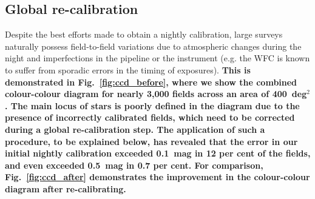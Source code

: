 \documentclass[a4paper,useAMS,usenatbib]{mn2e}
\begin{document}
\subsection{Global re-calibration}

Despite the best efforts made to obtain a nightly calibration,
large surveys naturally possess field-to-field variations
due to atmospheric changes during the night
and imperfections in the pipeline or the instrument
(e.g. the WFC is known to suffer from sporadic errors
in the timing of exposures).
{ \bf
This is demonstrated in Fig.~\ref{fig:ccd_before},
where we show the combined colour-colour diagram
for nearly 3,000 fields across an area of 400~deg$^2$.
The main locus of stars is poorly defined
in the diagram due to the presence of
incorrectly calibrated fields,
which need to be corrected
during a global re-calibration step.
The application of such a procedure,
to be explained below,
has revealed that the error in our initial nightly calibration
exceeded 0.1~mag in 12 per cent of the fields,
and even exceeded 0.5~mag in 0.7 per cent.
For comparison, Fig.~\ref{fig:ccd_after}
demonstrates the improvement 
in the colour-colour diagram
after re-calibrating. }
\end{document}
